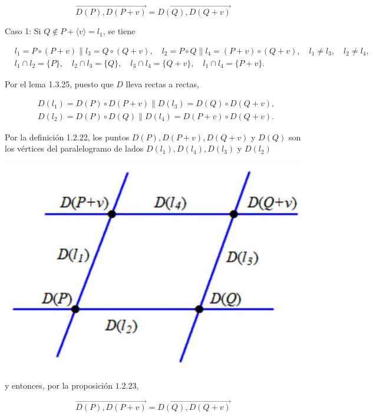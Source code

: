\documentclass[12pt, a4paper, ones, notitlepage, openany,titlepage]{article}
\begin{document}
$$
\overrightarrow{D(P), D(P+v)}=\overrightarrow{D(Q), D(Q+v)}
$$

Caso 1: Si $Q \notin P+\langle v\rangle=l_{1}$, se tiene

$$
\begin{aligned}
& l_{1}=P \circ(P+v)\left\|l_{3}=Q \circ(Q+v), \quad l_{2}=P \circ Q\right\| l_{4}=(P+v) \circ(Q+v), \quad l_{1} \neq l_{3}, \quad l_{2} \neq l_{4}, \\
& l_{1} \cap l_{2}=\{P\}, \quad l_{2} \cap l_{3}=\{Q\}, \quad l_{3} \cap l_{4}=\{Q+v\}, \quad l_{1} \cap l_{4}=\{P+v\} .
\end{aligned}
$$

Por el lema 1.3.25, puesto que $D$ lleva rectas a rectas,

$$
\begin{aligned}
& D\left(l_{1}\right)=D(P) \circ D(P+v) \| D\left(l_{3}\right)=D(Q) \circ D(Q+v), \\
& D\left(l_{2}\right)=D(P) \circ D(Q) \| D\left(l_{4}\right)=D(P+v) \circ D(Q+v) .
\end{aligned}
$$

Por la definición 1.2.22, los puntos $D(P), D(P+v), D(Q+v)$ y $D(Q)$ son los vértices del paralelogramo de lados $D\left(l_{1}\right), D\left(l_{4}\right), D\left(l_{3}\right)$ y $D\left(l_{2}\right)$

\begin{center}
\includegraphics[max width=\textwidth]{2023_03_01_7659aec5e35f9a9b2d3cg-31}
\end{center}

y entonces, por la proposición $1.2 .23$,

$$
\overrightarrow{D(P), D(P+v)}=\overrightarrow{D(Q), D(Q+v)}
$$
\end{document}
